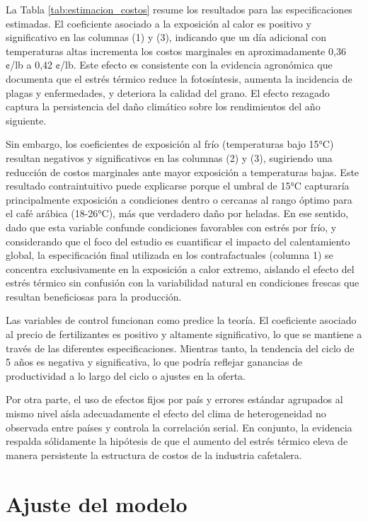 La Tabla \ref{tab:estimacion_costos} resume los resultados para las especificaciones estimadas. El coeficiente asociado a la exposición al calor es positivo y significativo en las columnas (1) y (3), indicando que un día adicional con temperaturas altas incrementa los costos marginales en aproximadamente 0,36 ¢/lb a 0,42 ¢/lb. Este efecto es consistente con la evidencia agronómica que documenta que el estrés térmico reduce la fotosíntesis, aumenta la incidencia de plagas y enfermedades, y deteriora la calidad del grano. El efecto rezagado captura la persistencia del daño climático sobre los rendimientos del año siguiente.

Sin embargo, los coeficientes de exposición al frío (temperaturas bajo 15°C) resultan negativos y significativos en las columnas (2) y (3), sugiriendo una reducción de costos marginales ante mayor exposición a temperaturas bajas. Este resultado contraintuitivo puede explicarse porque el umbral de 15°C capturaría principalmente exposición a condiciones dentro o cercanas al rango óptimo para el café arábica (18-26°C), más que verdadero daño por heladas. En ese sentido, dado que esta variable confunde condiciones favorables con estrés por frío, y considerando que el foco del estudio es cuantificar el impacto del calentamiento global, la especificación final utilizada en los contrafactuales (columna 1) se concentra exclusivamente en la exposición a calor extremo, aislando el efecto del estrés térmico sin confusión con la variabilidad natural en condiciones frescas que resultan beneficiosas para la producción.

Las variables de control funcionan como predice la teoría. El coeficiente asociado al precio de fertilizantes es positivo y altamente significativo, lo que se mantiene a través de las diferentes especificaciones. Mientras tanto, la tendencia del ciclo de 5 años es negativa y significativa, lo que podría reflejar ganancias de productividad a lo largo del ciclo o ajustes en la oferta.

Por otra parte, el uso de efectos fijos por país y errores estándar agrupados al mismo nivel aísla adecuadamente el efecto del clima de heterogeneidad no observada entre países y controla la correlación serial. En conjunto, la evidencia respalda sólidamente la hipótesis de que el aumento del estrés térmico eleva de manera persistente la estructura de costos de la industria cafetalera.



\section{Ajuste del modelo}

